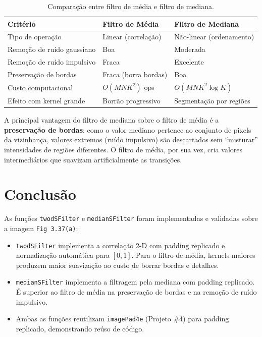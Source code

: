 \documentclass[12pt,a4paper]{article}
\begin{document}
\begin{table}[ht]
  \centering
  \caption{Comparação entre filtro de média e filtro de mediana.}
  \label{tab:compare}
  \begin{tabular}{lll}
    \toprule
    \textbf{Critério} & \textbf{Filtro de Média} & \textbf{Filtro de Mediana} \\
    \midrule
    Tipo de operação   & Linear (correlação) & Não-linear (ordenamento) \\
    Remoção de ruído gaussiano & Boa & Moderada \\
    Remoção de ruído impulsivo & Fraca & Excelente \\
    Preservação de bordas & Fraca (borra bordas) & Boa \\
    Custo computacional & $O(M N K^2)$ ops & $O(M N K^2 \log K)$ \\
    Efeito com kernel grande & Borrão progressivo & Segmentação por regiões \\
    \bottomrule
  \end{tabular}
\end{table}

A principal vantagem do filtro de mediana sobre o filtro de média é a
\textbf{preservação de bordas}: como o valor mediano pertence ao conjunto
de pixels da vizinhança, valores extremos (ruído impulsivo) são
descartados sem ``misturar'' intensidades de regiões diferentes. O filtro
de média, por sua vez, cria valores intermediários que suavizam
artificialmente as transições.

\section{Conclusão}

As funções \texttt{twodSFilter} e \texttt{medianSFilter} foram implementadas
e validadas sobre a imagem \texttt{Fig\,3.37(a)}:

\begin{itemize}
  \item \texttt{twodSFilter} implementa a correlação 2-D com padding
        replicado e normalização automática para $[0,1]$. Para o filtro
        de média, kernels maiores produzem maior suavização ao custo de
        borrar bordas e detalhes.
  \item \texttt{medianSFilter} implementa a filtragem pela mediana com
        padding replicado. É superior ao filtro de média na preservação
        de bordas e na remoção de ruído impulsivo.
  \item Ambas as funções reutilizam \texttt{imagePad4e} (Projeto \#4)
        para padding replicado, demonstrando reúso de código.
\end{itemize}
\end{document}
